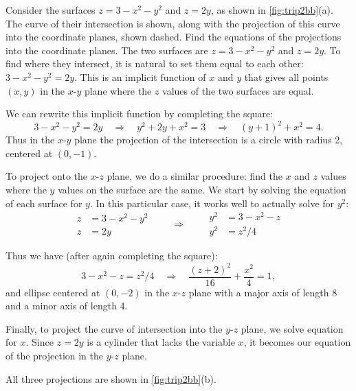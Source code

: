 \begin{example}\label{ex_trip2b}%
Consider the surfaces $z=3-x^2-y^2$ and $z=2y$, as shown in \autoref{fig:trip2bb}(a). The curve of their intersection is shown, along with the projection of this curve into the coordinate planes, shown dashed. Find the equations of the projections into the coordinate planes.
\solution
The two surfaces are $z=3-x^2-y^2$ and $z=2y$. To find where they intersect, it is natural to set them equal to each other: $3-x^2-y^2=2y$. This is an implicit function of $x$ and $y$ that gives all points $(x,y)$ in the $x$-$y$ plane where the $z$ values of the two surfaces are equal. 

We can rewrite this implicit function by completing the square:
\[3-x^2-y^2=2y \quad \Rightarrow \quad y^2+2y+x^2=3\quad \Rightarrow \quad (y+1)^2+x^2=4.\]
Thus in the $x$-$y$ plane the projection of the intersection is a circle with radius 2, centered at $(0,-1)$.

To project onto the $x$-$z$ plane, we do a similar procedure: find the $x$ and $z$ values where the $y$ values on the surface are the same. We start by solving the equation of each surface for $y$. In this particular case, it works well to actually solve for $y^2$:
\[
\begin{aligned}
z&=3-x^2-y^2\\
z&=2y
\end{aligned}
\qquad\Rightarrow\qquad
\begin{aligned}
y^2&=3-x^2-z\\
y^2&=z^2/4
\end{aligned}
\]

Thus we have (after again completing the square):
\[3-x^2-z = z^2/4 \quad \Rightarrow\quad \frac{(z+2)^2}{16}+\frac{x^2}4=1,\]
and ellipse centered at $(0,-2)$ in the $x$-$z$ plane with a major axis of length 8 and a minor axis of length 4. 

Finally, to project the curve of intersection into the $y$-$z$ plane, we solve equation for $x$. Since $z=2y$ is a cylinder that lacks the variable $x$, it becomes our equation of the projection in the $y$-$z$ plane.

All three projections are shown in \autoref{fig:trip2bb}(b).
\end{example}


